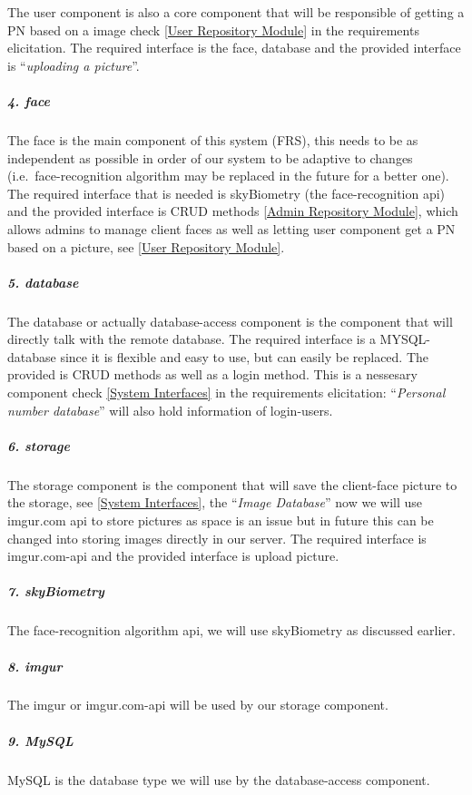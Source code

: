 \documentclass[a4paper,11pt]{article}
\begin{document}
The user component is also a core component that will be responsible of
getting a PN based on a image check \ref{User Repository Module} in the requirements elicitation. The required
interface is the face, database and the provided interface is
``\emph{uploading a picture}''. 

\subparagraph{4. face}\label{face}

The face is the main component of this system (FRS), this needs to be as
independent as possible in order of our system to be adaptive to changes
(i.e.~face-recognition algorithm may be replaced in the future for a
better one). The required interface that is needed is skyBiometry (the
face-recognition api) and the provided interface is CRUD methods \ref{Admin Repository Module}, which
allows admins to manage client faces as well as letting user component
get a PN based on a picture, see \ref{User Repository Module}.

\subparagraph{5. database}\label{database}

The database or actually database-access component is the component that
will directly talk with the remote database. The required interface is a
MYSQL-database since it is flexible and easy to use, but can easily be replaced. The provided is CRUD methods as well as a login method. This is a nessesary component check \ref{System Interfaces} in the requirements elicitation: ``\emph{Personal number database}'' will also hold information of login-users.

\subparagraph{6. storage}\label{storage}

The storage component is the component that will save the client-face
picture to the storage, see \ref{System Interfaces}, the ``\emph{Image Database}'' now we will use imgur.com api to store pictures
as space is an issue but in future this can be changed into storing
images directly in our server. The required interface is imgur.com-api
and the provided interface is upload picture.

\subparagraph{7. skyBiometry}\label{skybiometry}

The face-recognition algorithm api, we will use skyBiometry as discussed
earlier.

\subparagraph{8. imgur}\label{imgur}

The imgur or imgur.com-api will be used by our storage component.

\subparagraph{9. MySQL}\label{mysql}

MySQL is the database type we will use by the database-access component.
\end{document}
